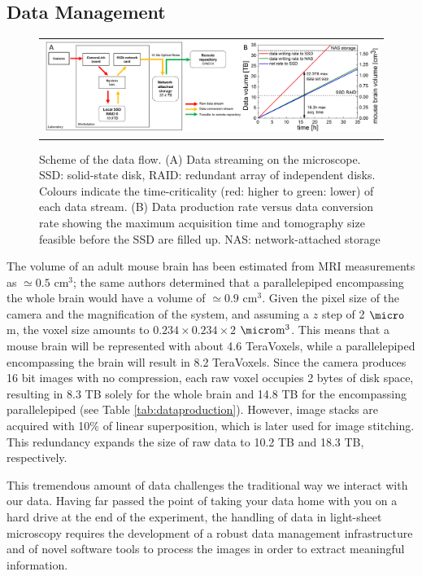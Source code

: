 \documentclass[12pt]{spieman}  %
\begin{document}
\begin{spacing}{2}
\section{Data Management}
\label{sec:dataflow}


	\begin{figure}
   \begin{center}
   \begin{tabular}{c}
   \includegraphics[width=\textwidth]{DataFlow.eps}
   \end{tabular}
   \end{center}
   \caption{\label{fig:DataFlow} Scheme of the data flow. (A) Data streaming on the microscope. SSD: solid-state disk, RAID: redundant array of independent disks. Colours indicate the time-criticality (red: higher to green: lower) of each data stream. (B) Data production rate versus data conversion rate showing the maximum acquisition time and tomography size feasible before the SSD are filled up. NAS: network-attached storage} 
   \end{figure}

The volume of an adult mouse brain has been estimated from MRI measurements \cite{Kovacevic2005} as $\simeq 0.5$ $\text{cm}^3$; the same authors determined that a parallelepiped encompassing the whole brain would have a volume of $\simeq 0.9$ $\text{cm}^3$. Given the pixel size of the camera and the magnification of the system, and assuming a $z$ step of 2 $\micro$m, the voxel size amounts to $0.234\times0.234\times2$ $\micro\text{m}^3$. This means that a mouse brain will be represented with about 4.6 TeraVoxels, while a parallelepiped encompassing the brain will result in 8.2 TeraVoxels. Since the camera produces 16 bit images with no compression, each raw voxel occupies 2 bytes of disk space, resulting in 8.3 TB solely for the whole brain and 14.8 TB for the encompassing parallelepiped (see Table \ref{tab:dataproduction}). However, image stacks are acquired with 10\% of linear superposition, which is later used for image stitching. This redundancy expands the size of raw data to 10.2 TB and 18.3 TB, respectively.

This tremendous amount of data challenges the traditional way we interact with our data. Having far passed the point of taking your data home with you on a hard drive at the end of the experiment, the handling of data in light-sheet microscopy requires the development of a robust data management infrastructure and of novel software tools to process the images in order to extract meaningful information.


\end{spacing}
\end{document}
